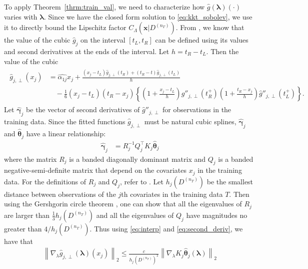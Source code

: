 \documentclass[10pt]{book}
\theoremstyle{definition}
\begin{document}
	To apply Theorem~\ref{thrm:train_val}, we need to characterize how $\hat{g}(\boldsymbol{\lambda})(\cdot)$ varies with $\boldsymbol{\lambda}$.
	Since we have the closed form solution to \eqref{eq:kkt_sobolev}, we use it to directly bound the Lipschitz factor $C_\Lambda(\boldsymbol{x} | D^{(n_T)})$.
	From \citet{green1993nonparametric}, we know that the value of the cubic $\hat{g}_j$ on the interval $[t_L, t_R]$ can be defined using its values and second derivatives at the ends of the interval.
	Let $h = t_R - t_L$.
	Then the value of the cubic
	\begin{align}
	\begin{split}
	\hat{g}_{j,\perp}(x_j)
	& = \hat{\alpha_{1j}} x_j
	+ \frac{(x_j - t_L) \hat{g}_{j, \perp} (t_R) + (t_R - t) \hat{g}_{j, \perp}(t_L)}{h}\\
	& \quad - \frac{1}{6}(x_j - t_L)(t_R - x_j) \left\{
	\left(
	1 + \frac{x_j - t_L}{h}
	\right) \hat{g}''_{j, \perp}(t_R^+)
	\left(
	1 + \frac{t_R - x_j}{h}
	\right) \hat{g}''_{j, \perp}(t_L^+)
	\right \}.
	\label{eq:interp}
	\end{split}
	\end{align}
	Let $\hat{\boldsymbol{\gamma}}_j$ be the vector of second derivatives of $\hat{g}''_{j, \perp}$ for observations in the training data.
	Since the fitted functions $\hat{g}_{j, \perp}$ must be natural cubic splines, $\hat{\boldsymbol{\gamma}}_j$ and $\hat{\boldsymbol{\theta}}_j$ have a linear relationship:
	\begin{align}
	\hat{\boldsymbol{\gamma}}_j & = R^{-1}_j Q^\top_j K_j \hat{\boldsymbol{\theta}}_j
	\label{eq:second_deriv}
	\end{align}
	where the matrix $R_j$ is a banded diagonally dominant matrix and $Q_j$ is a banded negative-semi-definite matrix that depend on the covariates $x_j$ in the training data.
	For the definitions of $R_j$ and $Q_j$, refer to \citet{green1993nonparametric}.
	Let $h_j(D^{(n_T)})$ be the smallest distance between observations of the $j$th covariates in the training data $T$.
	Then using the Gershgorin circle theorem \citep{gershgorin1931uber}, one can show that all the eigenvalues of $R_j$ are larger than $\frac{1}{3} h_j(D^{(n_T)})$ and all the eigenvalues of $Q_j$ have magnitudes no greater than $4/h_j(D^{(n_T)})$.
	Thus using \eqref{eq:interp} and \eqref{eq:second_deriv}, we have that
	\begin{align}
	\left \|
	\nabla_{\lambda} \hat{g}_{j, \perp}(\boldsymbol{\lambda})(x_j)
	\right \|_2
	\le
	\frac{c}{h_j(D^{(n_T)})^2}
	\left\|
	\nabla_{\lambda} K_j \hat{\boldsymbol{\theta}}_j(\boldsymbol{\lambda})
	\right \|_2
	\end{align}
\end{document}
